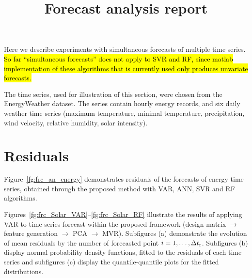 \documentclass[conference]{IEEEtran}
\begin{document}
\title{Forecast analysis report}


Here we describe experiments with simultaneous forecasts of multiple time series. \hl{So far ``simultaneous forecasts'' does not apply to SVR and RF, since matlab implementation of these algorithms that is currently used only produces unvariate forecasts.}

The time series, used for illustration of this section, were chosen from the EnergyWeather dataset. The series contain hourly energy records, and six daily weather time series (maximum temperature, minimal temperature, precipitation,  wind velocity, relative humidity, solar intensity).

\section{Residuals}
Figure~\ref{fg:frc_an_energy} demonstrates residuals of the forecasts of energy time series, obtained through the proposed method with VAR, ANN, SVR and RF algorithms.

Figures~\ref{fg:frc_Solar_VAR}--\ref{fg:frc_Solar_RF} illustrate the results of applying VAR to time series forecast within the proposed framework (design matrix $\rightarrow$ feature generation $\rightarrow$ PCA $\rightarrow$ MVR). Subfigures (a) demonstrate the evolution of mean residuals by the number of forecasted point $i = 1, \dots, \Delta t_\text{r}$. Subfigures (b) display normal probability density functions, fitted to the residuals of each time series and subfigures (c) display the quantile-quantile plots for the fitted distributions.
\end{document}
